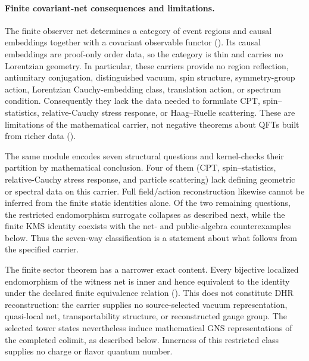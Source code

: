 \paragraph{Finite covariant-net consequences and limitations.}
The finite observer net determines a category of event regions and causal
embeddings together with a covariant observable functor
().  Its causal embeddings are
proof-only order data, so the category is thin and carries no Lorentzian
geometry.  In particular, these carriers provide no region reflection,
antiunitary conjugation, distinguished vacuum, spin structure, symmetry-group
action, Lorentzian Cauchy-embedding class, translation action, or spectrum condition.
Consequently they lack the data needed to formulate CPT, spin--statistics,
relative-Cauchy
stress response, or Haag--Ruelle scattering.  These are limitations of the
mathematical carrier, not negative theorems about QFTs built from richer data
().

The same module encodes seven structural questions and kernel-checks their
partition by mathematical conclusion.  Four of them (CPT, spin--statistics,
relative-Cauchy stress response, and particle scattering) lack defining
geometric or spectral data on this carrier.  Full field/action reconstruction
likewise cannot be inferred from the finite static identities alone.  Of the
two remaining questions, the restricted endomorphism surrogate collapses as
described next, while the finite KMS identity coexists with the net- and
public-algebra counterexamples below.  Thus the seven-way classification is a
statement about what follows from the specified carrier.

The finite sector theorem has a narrower exact content.  Every bijective
localized endomorphism of the witness net is inner and hence equivalent to the
identity under the declared finite equivalence relation
().  This does not constitute DHR
reconstruction: the carrier supplies no source-selected vacuum
representation, quasi-local net, transportability structure, or reconstructed
gauge group.  The selected tower states nevertheless induce mathematical GNS
representations of the completed colimit, as described below.
Innerness of this restricted class supplies no charge or flavor quantum
number.

